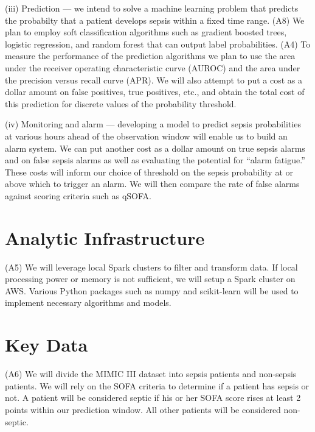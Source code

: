 \documentclass{amia}
\begin{document}
	 (iii) Prediction --- we intend to solve a machine learning problem
	that predicts the probabilty that a patient develops sepsis within a fixed
        time range.
	 (A8) We plan to employ soft classification algorithms such as gradient boosted
	trees, logistic regression, and random forest that can
	output label probabilities.
	 (A4) To measure the performance of the prediction algorithms we plan to use
	the area under the receiver operating characteristic
	curve (AUROC) and the area under the precision versus recall curve (APR).
	 We will also attempt to put a cost as a dollar amount on false positives, 
	true positives, etc., and obtain the total cost of this prediction for discrete 
        values of the probability threshold.%

	 (iv) Monitoring and alarm --- developing a model to predict
	sepsis probabilities at various hours ahead of the observation window 
	will enable us to build an alarm system.
	 We can put another cost as a dollar amount on true sepsis alarms and
	on false sepsis alarms as well as evaluating the potential for 
        ``alarm fatigue.''  
	 These costs will inform our choice of threshold on the sepsis probability
	 at or above which to trigger an alarm. We will then compare the rate of false 
         alarms against scoring criteria such as qSOFA.


\section*{Analytic Infrastructure}

	 (A5) We will leverage local Spark clusters to filter and transform
	data. If local processing power or memory is not sufficient,
	we will setup a Spark cluster on AWS. Various Python packages
	such as numpy and scikit-learn will be used to implement
	necessary algorithms and models.
	
\section*{Key Data}

	(A6) We will divide the MIMIC III dataset into sepsis
	patients and non-sepsis patients.
	 We will rely on the SOFA criteria to determine if a patient has sepsis or not. 
	 A patient will be considered septic if his or her SOFA score rises
	at least 2 points within our prediction window. 
	 All other patients will be considered non-septic.
\end{document}
